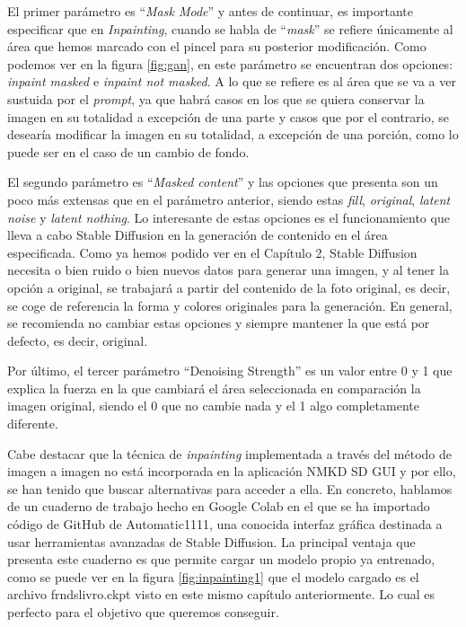 El primer parámetro es ``\textit{Mask Mode}'' y antes de continuar, es importante especificar que en \textit{Inpainting}, cuando se habla de ``\textit{mask}'' se refiere únicamente al área que hemos marcado con el pincel para su posterior modificación. Como podemos ver en la figura \ref{fig:gan}, en este parámetro se encuentran dos opciones: \textit{inpaint masked} e \textit{inpaint not masked}. A lo que se refiere es al área que se va a ver sustuida por el \textit{prompt}, ya que habrá casos en los que se quiera conservar la imagen en su totalidad a excepción de una parte y casos que por el contrario, se desearía modificar la imagen en su totalidad, a excepción de una porción, como lo puede ser en el caso de un cambio de fondo. 

El segundo parámetro es ``\textit{Masked content}'' y las opciones que presenta son un poco más extensas que en el parámetro anterior, siendo estas \textit{fill}, \textit{original}, \textit{latent noise} y \textit{latent nothing}. Lo interesante de estas opciones es el funcionamiento que lleva a cabo Stable Diffusion en la generación de contenido en el área especificada. Como ya hemos podido ver en el Capítulo 2, Stable Diffusion necesita o bien ruido o bien nuevos datos para generar una imagen, y al tener la opción a original, se trabajará a partir del contenido de la foto original, es decir, se coge de referencia la forma y colores originales para la generación. En general, se recomienda no cambiar estas opciones y siempre mantener la que está por defecto, es decir, original. 

Por último, el tercer parámetro ``Denoising Strength'' es un valor entre 0 y 1 que explica la fuerza en la que cambiará el área seleccionada en comparación la imagen original, siendo el 0 que no cambie nada y el 1 algo completamente diferente. 

Cabe destacar que la técnica de \textit{inpainting} implementada a través del método de imagen a imagen no está incorporada en la aplicación NMKD SD GUI y por ello, se han tenido que buscar alternativas para acceder a ella. En concreto, hablamos de un cuaderno de trabajo hecho en Google Colab en el que se ha importado código de GitHub de Automatic1111, una conocida interfaz gráfica destinada a usar herramientas avanzadas de Stable Diffusion. La principal ventaja que presenta este cuaderno es que permite cargar un modelo propio ya entrenado, como se puede ver en la figura \ref{fig:inpainting1} que el modelo cargado es el archivo frndslivro.ckpt visto en este mismo capítulo anteriormente. Lo cual es perfecto para el objetivo que queremos conseguir. 

